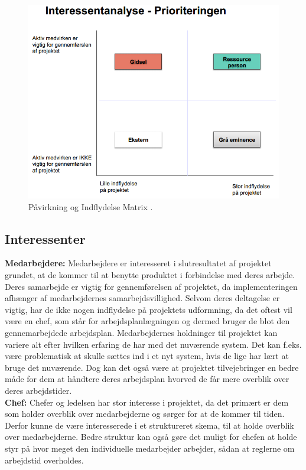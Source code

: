 \begin{figure}
    \centering
    \includegraphics[width=1\textwidth]{figures/Udklip.PNG}
    \caption{Påvirkning og Indflydelse Matrix \citep{Holgaard2014}.} 
    \label{fig:PåvirkInflydMat}
\end{figure}

\subsection{Interessenter}
\textbf{Medarbejdere:}
Medarbejdere er interesseret i slutresultatet af projektet grundet, at de kommer til at benytte produktet i forbindelse med deres arbejde. Deres samarbejde er vigtig for gennemførelsen af projektet, da implementeringen afhænger af medarbejdernes samarbejdsvillighed. Selvom deres deltagelse er vigtig, har de ikke nogen indflydelse på projektets udformning, da det oftest vil være en chef, som står for arbejdsplanlægningen og dermed bruger de blot den gennemarbejdede arbejdsplan. Medarbejdernes holdninger  til projektet kan variere alt efter hvilken erfaring de har med det nuværende system. Det kan f.eks. være problematisk at skulle sættes ind i et nyt system, hvis de lige har lært at bruge det nuværende. Dog kan det også være at projektet tilvejebringer en bedre måde for dem at håndtere deres arbejdsplan hvorved de får mere overblik over deres arbejdstider.\\

\noindent\textbf{Chef:}
Chefer og ledelsen har stor interesse i projektet, da det primært er dem som holder overblik over medarbejderne og sørger for at de kommer til tiden. Derfor kunne de være interesserede i et struktureret skema, til at holde overblik over medarbejderne. Bedre struktur kan også gøre det muligt for chefen at holde styr på hvor meget den individuelle medarbejder arbejder, sådan at reglerne om arbejdstid overholdes.\\

